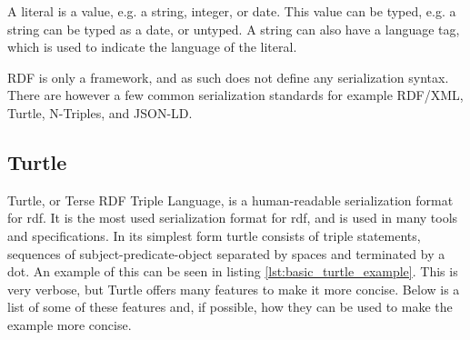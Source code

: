 A literal is a value, e.g. a string, integer, or date. This value can be typed, e.g. a string can be typed as a date, or untyped. A string can also have a language tag, which is used to indicate the language of the literal.

RDF is only a framework, and as such does not define any serialization syntax. There are however a few common serialization standards for example RDF/XML, Turtle, N-Triples, and JSON-LD. 

\subsection{Turtle}
Turtle, or Terse RDF Triple Language, is a human-readable serialization format for \acrshort{rdf}. It is the most used serialization format for \acrshort{rdf}, and is used in many tools and specifications. 
In its simplest form turtle consists of triple statements, sequences of subject-predicate-object separated by spaces and terminated by a dot. An example of this can be seen in listing \ref{lst:basic_turtle_example}. This is very verbose, but Turtle offers many features to make it more concise. Below is a list of some of these features and, if possible, how they can be used to make the example more concise.
